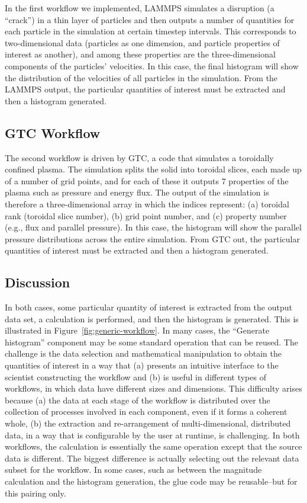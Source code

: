 \documentclass[conference]{IEEEtran}
\begin{document}
In the first workflow we implemented, LAMMPS simulates a disruption (a ``crack'')
in a thin layer of particles and then outputs a number of quantities for
each particle in the simulation at certain timestep intervals.  This
corresponds to two-dimensional data (particles as one dimension, and particle properties
of interest as another), and among these properties are the
three-dimensional components of the particles’ velocities. In this case, the final
histogram will show the distribution of the velocities of all particles in the
simulation.  From the LAMMPS output, the particular quantities of interest must
be extracted and then a histogram generated.

\subsection{GTC Workflow}

The second workflow is driven by GTC, a code that simulates a toroidally
confined plasma. The simulation splits the solid into toroidal slices, each
made up of a number of grid points, and for each of these it outputs 7
properties of the plasma such as pressure and energy flux. The output of the
simulation is therefore a three-dimensional array in which the indices
represent: (a) toroidal rank (toroidal slice number), (b) grid point number,
and (c) property number (e.g., flux and parallel pressure). In this case, the
histogram will show the parallel pressure distributions across the entire
simulation. From GTC out, the particular quantities of interest must be
extracted and then a histogram generated.

\subsection{Discussion}

In both cases, some particular quantity of interest is extracted from the
output data set, a calculation is performed, and then the histogram is
generated. This is illustrated in Figure~\ref{fig:generic-workflow}. In many
cases, the ``Generate histogram'' component may be some standard operation that
can be reused. The challenge is the data selection and mathematical
manipulation to obtain the quantities of interest in a way that (a) presents
an intuitive interface to the scientist constructing the workflow and (b) is useful in different
types of workflows, in which data have different sizes and dimensions.
This difficulty arises because (a) the data at each stage of the workflow
is distributed over the collection of processes
involved in each component, even if it forms a coherent whole, (b)
the extraction and re-arrangement of multi-dimensional, distributed data,
in a way that is configurable by the user at runtime, is challenging.
In both workflows, the calculation is essentially the same operation except
that the source data is different. The biggest difference is actually selecting out the relevant data
subset for the workflow. In some cases, such as between the magnitude
calculation and the histogram generation, the glue code may be reusable--but
for this pairing only.
\end{document}
